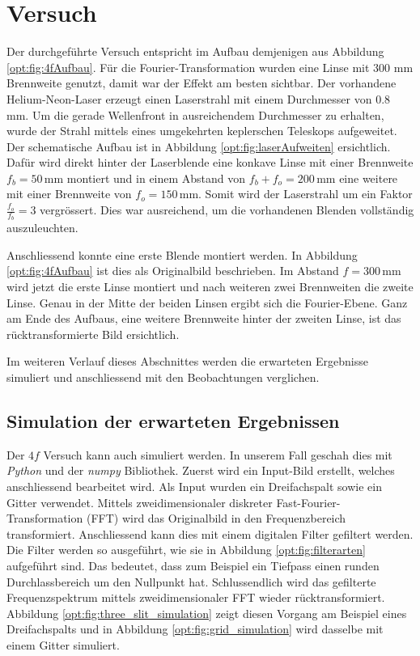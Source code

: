 %
%
%
%
\section{Versuch
  \label{opt:section:versuch}}

Der durchgeführte Versuch entspricht im Aufbau demjenigen aus Abbildung \ref{opt:fig:4fAufbau}.
Für die Fourier-Transformation wurden eine Linse mit 300 mm Brennweite genutzt, damit war der Effekt am besten sichtbar.
Der vorhandene Helium-Neon-Laser erzeugt einen Laserstrahl mit einem Durchmesser von $0.8$ mm.
Um die gerade Wellenfront in ausreichendem Durchmesser zu erhalten, wurde der Strahl mittels eines umgekehrten keplerschen Teleskops aufgeweitet.
Der schematische Aufbau ist in Abbildung \ref{opt:fig:laserAufweiten} ersichtlich.
Dafür wird direkt hinter der Laserblende eine konkave Linse mit einer Brennweite $f_b = 50\,\text{mm}$ montiert 
und in einem Abstand von $f_b + f_o = 200\,\text{mm}$ eine weitere mit einer Brennweite von $f_o = 150\,\text{mm}$.
Somit wird der Laserstrahl um ein Faktor $\frac{f_o}{f_b} = 3$ vergrössert.
Dies war ausreichend, um die vorhandenen Blenden vollständig auszuleuchten.

Anschliessend konnte eine erste Blende montiert werden.
In Abbildung \ref{opt:fig:4fAufbau} ist dies als Originalbild beschrieben.
Im Abstand $f=300\,\text{mm}$ wird jetzt die erste Linse montiert und nach weiteren zwei Brennweiten die zweite Linse.
Genau in der Mitte der beiden Linsen ergibt sich die Fourier-Ebene.
Ganz am Ende des Aufbaus, eine weitere Brennweite hinter der zweiten Linse, ist das rücktransformierte Bild ersichtlich.

Im weiteren Verlauf dieses Abschnittes werden die erwarteten Ergebnisse simuliert und anschliessend mit den Beobachtungen verglichen.

\subsection{Simulation der erwarteten Ergebnissen}
Der $4f$ Versuch kann auch simuliert werden.
In unserem Fall geschah dies mit \emph{Python} und der \emph{numpy} Bibliothek.
Zuerst wird ein Input-Bild erstellt, welches anschliessend bearbeitet wird.
Als Input wurden ein Dreifachspalt sowie ein Gitter verwendet.
Mittels zweidimensionaler diskreter Fast-Fourier-Transformation (FFT) wird das Originalbild in den Frequenzbereich transformiert.
Anschliessend kann dies mit einem digitalen Filter gefiltert werden.
Die Filter werden so ausgeführt, wie sie in Abbildung \ref{opt:fig:filterarten} aufgeführt sind.
Das bedeutet, dass zum Beispiel ein Tiefpass einen runden Durchlassbereich um den Nullpunkt hat.
Schlussendlich wird das gefilterte Frequenzspektrum mittels zweidimensionaler FFT wieder rücktransformiert.
Abbildung \ref{opt:fig:three_slit_simulation} zeigt diesen Vorgang am Beispiel eines Dreifachspalts und 
in Abbildung \ref{opt:fig:grid_simulation} wird dasselbe mit einem Gitter simuliert.

